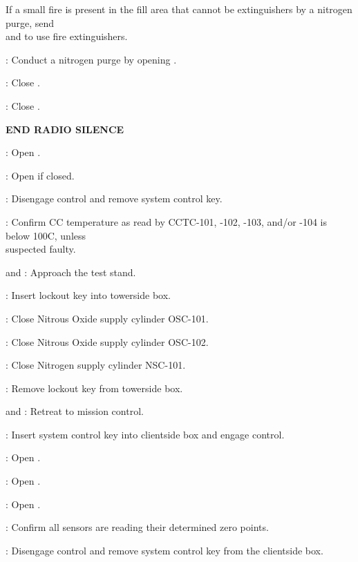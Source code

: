 \begin{checklist}
\begin{checklist}[label=$\bullet$]
\begin{checklist}
                \item If a small fire is present in the fill area that cannot be extinguishers by a nitrogen purge, send  \\ \phantom{} \hspace{12ex} \primary{} and \secondary{} to use fire extinguishers. 
                \end{checklist} 
            \end{checklist}
    \item \rlcs{}: Conduct a nitrogen purge by opening \purge{}. 
    \item \rlcs{}: Close \purge{}. 
    \item \rlcs{}: Close \inj{}. 
    \item \textbf{END RADIO SILENCE}
    \item \rlcs{}: Open \vent{}. 
    \item \rlcs{}: Open \oxiso{} if closed. 
    \item \rlcs{}: Disengage control and remove system control key.
    \item \daq{}: Confirm CC temperature as read by CCTC-101, -102, -103, and/or -104 is below 100\textdegree C, unless \\ \phantom{} \hspace{3ex} suspected faulty. 
    \item \primary{} and \secondary{}: Approach the test stand. 
    \item \secondary{}: Insert lockout key into towerside box. 
    \item \primary{}: Close Nitrous Oxide supply cylinder OSC-101.
    \item \primary{}: Close Nitrous Oxide supply cylinder OSC-102. 
    \item \primary{}: Close Nitrogen supply cylinder NSC-101.
    \item \secondary{}: Remove lockout key from towerside box.
    \item \primary{} and \secondary{}: Retreat to mission control. 
    \item \rlcs{}: Insert system control key into clientside box and engage control. 
    \item \rlcs{}: Open \oxdrain{}{}.
    \item \rlcs{}: Open \oxfill{}{}.
    \item \rlcs{}: Open \purge{}. 
    \item \daq{}: Confirm all sensors are reading their determined zero points. 
    \item \rlcs{}: Disengage control and remove system control key from the clientside box.

\end{checklist}
